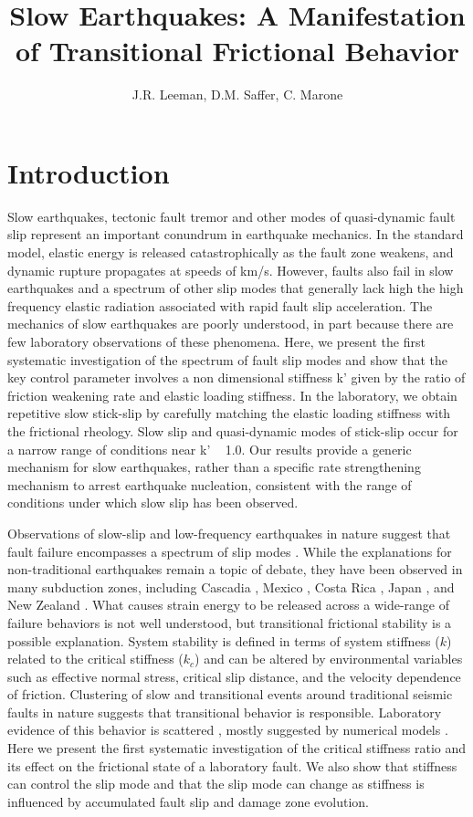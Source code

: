 \documentclass[11pt]{article}
\title{Slow Earthquakes: A Manifestation of Transitional Frictional Behavior}
\author{J.R. Leeman, D.M. Saffer, C. Marone}
\date{} %
\begin{document}
\maketitle

\section{Introduction}

Slow earthquakes, tectonic fault tremor and other modes of quasi-dynamic fault
slip represent an important conundrum in earthquake mechanics.  In the standard
model, elastic energy is released catastrophically as the fault zone weakens,
and dynamic rupture propagates at speeds of km/s. However, faults also fail in
slow earthquakes and a spectrum of other slip modes that generally lack high the
high frequency elastic radiation associated with rapid fault slip acceleration.
The mechanics of slow earthquakes are poorly understood, in part because there
are few laboratory observations of these phenomena.  Here, we present the first
systematic investigation of the spectrum of fault slip modes and show that the
key control parameter involves a non dimensional stiffness k’ given by the ratio
of friction weakening rate and elastic loading stiffness. In the laboratory, we
obtain repetitive slow stick-slip by carefully matching the elastic loading
stiffness with the frictional rheology. Slow slip and quasi-dynamic modes of
stick-slip occur for a narrow range of conditions near k’ ~ 1.0. Our results
provide a generic mechanism for slow earthquakes, rather than a specific rate
strengthening mechanism to arrest earthquake nucleation, consistent with the
range of conditions under which slow slip has been observed.

Observations of slow-slip and low-frequency earthquakes in nature suggest that
fault failure encompasses a spectrum of slip modes \cite{Peng:2010, Ide:2007,
Beroza:2011}.  While the explanations for non-traditional earthquakes remain a
topic of debate, they have been observed in many subduction zones, including
Cascadia \cite{Miller:2002, Rogers:2003}, Mexico \cite{Kostoglodov:2003}, Costa
Rica \cite{Jiang:2012}, Japan \cite{Ito:2006}, and New Zealand
\cite{Wallace:2010}. What causes strain energy to be released across a
wide-range of failure behaviors is not well understood, but transitional
frictional stability is a  possible explanation. System stability is defined in
terms of system stiffness ($k$) related to the critical stiffness ($k_{c}$) \cite{Gu:1984} and can be altered by
environmental variables such as effective normal stress, critical slip distance,
and the velocity dependence of friction. Clustering of slow and transitional
events around traditional seismic faults in nature suggests that transitional
behavior is responsible. Laboratory evidence of this behavior is scattered
\cite{Kaproth:2013, Baumberger:1994, Leeman:2015}, mostly suggested by numerical
models \cite{Gu:1984}. Here we present the first systematic investigation of the
critical stiffness ratio and its effect on the frictional state of a laboratory
fault. We also show that stiffness can control the slip mode and that the
slip mode can change as stiffness is influenced by accumulated fault slip and
damage zone evolution.
\end{document}
